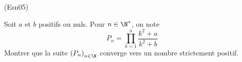 \begin{tiny}(Esn05)\end{tiny} Soit $a$ et $b$ positifs ou nuls. Pour $n\in \N^*$, on note
\begin{displaymath}
  P_n = \prod_{k=1}^n\frac{k^2 + a}{k^2 + b}
\end{displaymath}
Montrer que la suite $\left( P_n\right)_{n\in \N}$ converge vers un nombre strictement positif.